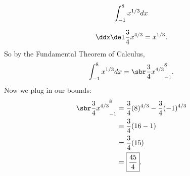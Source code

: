 \renewcommand{\avibounds}{_{-1}^8}
\renewcommand{\avifn}{x^{1/3}}
\renewcommand{\avianti}{\frac{3}{4}x^{4/3}}
\renewcommand{\aviconstant}{}

\begin{probboxed}
    \[
        \aviprob{}
    \]
\end{probboxed}

\aviinversepowerrule
\[
    \ddx\del\avianti{} = \avifn{}.
\]
So by the Fundamental Theorem of Calculus,
\[
    \aviprob{}
    = \avibounded{}.
\]
Now we plug in our bounds:
\begin{align*}
    \avibounded{}
    &= \frac{3}{4}(8)^{4/3} - \frac{3}{4}(-1)^{4/3} \\
    &= \frac{3}{4}(16 - 1) \\
    &= \frac{3}{4}(15) \\
    &= \boxed{\frac{45}{4}}.
\end{align*}
